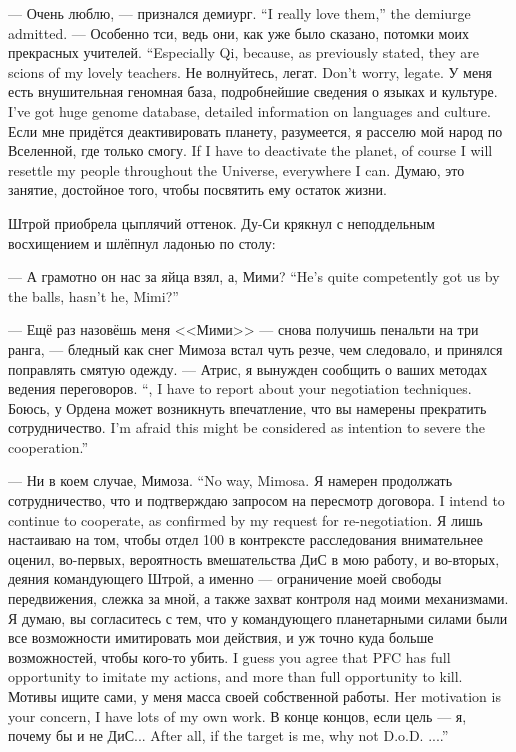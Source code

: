 {--- Очень люблю, --- признался демиург.}
{``I really love them,'' the demiurge admitted.}
{--- Особенно тси, ведь они, как уже было сказано, потомки моих прекрасных учителей.}
{``Especially Qi, because, as previously stated, they are scions of my lovely teachers.}
{Не волнуйтесь, легат.}
{Don't worry, legate.}
{У меня есть внушительная геномная база, подробнейшие сведения о языках и культуре.}
{I've got huge genome database, detailed information on languages and culture.}
{Если мне придётся деактивировать планету, разумеется, я расселю мой народ по Вселенной, где только смогу.}
{If I have to deactivate the planet, of course I will resettle my people throughout the Universe, everywhere I can.}
Думаю, это занятие, достойное того, чтобы посвятить ему остаток жизни.

Штрой приобрела цыплячий оттенок.
Ду-Си крякнул с неподдельным восхищением и шлёпнул ладонью по столу:

{--- А грамотно он нас за яйца взял, а, Мими?}
{``He's quite competently got us by the balls, hasn't he, Mimi?''}

--- Ещё раз назовёшь меня <<Мими>> --- снова получишь пенальти на три ранга, --- бледный как снег Мимоза встал чуть резче, чем следовало, и принялся поправлять смятую одежду.
{--- Атрис, я вынужден сообщить о ваших методах ведения переговоров.}
{``\Aatris, I have to report about your negotiation techniques.}
{Боюсь, у Ордена может возникнуть впечатление, что вы намерены прекратить сотрудничество.}
{I'm afraid this might be considered as intention to severe the cooperation.''}

{--- Ни в коем случае, Мимоза.}
{``No way, Mimosa.}
{Я намерен продолжать сотрудничество, что и подтверждаю запросом на пересмотр договора.}
{I intend to continue to cooperate, as confirmed by my request for re-negotiation.}
Я лишь настаиваю на том, чтобы отдел 100 в контрексте расследования внимательнее оценил, во-первых, вероятность вмешательства ДиС в мою работу, и во-вторых, деяния командующего Штрой, а именно --- ограничение моей свободы передвижения, слежка за мной, а также захват контроля над моими механизмами.
{Я думаю, вы согласитесь с тем, что у командующего планетарными силами были все возможности имитировать мои действия, и уж точно куда больше возможностей, чтобы кого-то убить.}
{I guess you agree that PFC has full opportunity to imitate my actions, and more than full opportunity to kill.} %
{Мотивы ищите сами, у меня масса своей собственной работы.}
{Her motivation is your concern, I have lots of my own work.}
{В конце концов, если цель --- я, почему бы и не ДиС...}
{After all, if the target is me, why not D.o.D. ....''}

